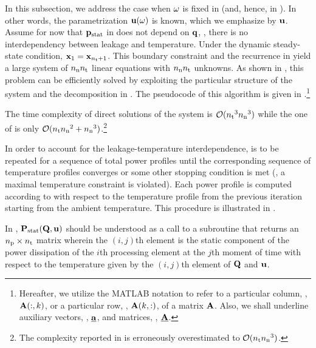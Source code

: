 In this subsection, we address the case when $\omega$ is fixed in  (and, hence, in ).
In other words, the parametrization $\mathbf{u}(\omega)$ is known, which we emphasize by $\mathbf{u}$.
Assume for now that $\mathbf{p}_{\text{stat}}$ in  does not depend on $\mathbf{q}$, \ie, there is no interdependency between leakage and temperature.
Under the dynamic steady-state condition, $\mathbf{x}_1 = \mathbf{x}_{{n_\text{t}} + 1}$.
This boundary constraint and the recurrence in  yield a large system of ${n_\text{n}} {n_\text{t}}$ linear equations with ${n_\text{n}} {n_\text{t}}$ unknowns.
As shown in \cite{ukhov2012}, this problem can be efficiently solved by exploiting the particular structure of the system and the decomposition in .
The pseudocode of this algorithm is given in .\footnote{Hereafter, we utilize the MATLAB notation to refer to a particular column, \eg, $\mathbf{A}(:, k)$, or a particular row, \eg, $\mathbf{A}(k, :)$, of a matrix $\mathbf{A}$. Also, we shall underline auxiliary vectors, \eg, $\underline{\mathbf{a}}$, and matrices, \eg, $\underline{\mathbf{A}}$.}


The time complexity of direct solutions of the system is $\mathcal{O}({n_\text{t}}^3 {n_\text{n}}^3)$ while the one of  is only $\mathcal{O}({n_\text{t}} {n_\text{n}}^2 + {n_\text{n}}^3)$.\footnote{The complexity reported in \cite{ukhov2012} is erroneously overestimated to $\mathcal{O}({n_\text{t}} {n_\text{n}}^3)$.}

In order to account for the leakage-temperature interdependence,  is to be repeated for a sequence of total power profiles until the corresponding sequence of temperature profiles converges or some other stopping condition is met (\eg, a maximal temperature constraint is violated).
Each power profile is computed according to  with respect to the temperature profile from the previous iteration starting from the ambient temperature.
This procedure is illustrated in .


In , $\mathbf{P}_{\text{stat}}(\mathbf{Q}, \mathbf{u})$ should be understood as a call to a subroutine that returns an ${n_\text{p}} \times {n_\text{t}}$ matrix wherein the $(i, j)$th element is the static component of the power dissipation of the $i$th processing element at the $j$th moment of time with respect to the temperature given by the $(i, j)$th element of $\mathbf{Q}$ and $\mathbf{u}$.

